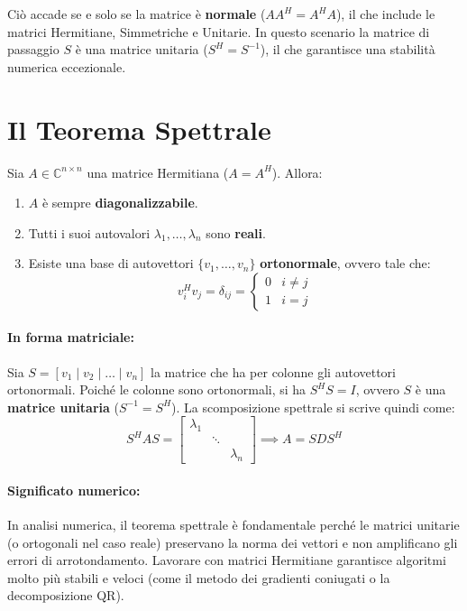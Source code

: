 \documentclass[a4paper,12pt]{article}
\begin{document}
	Ciò accade se e solo se la matrice è \textbf{normale} ($AA^H = A^HA$), il che include le matrici Hermitiane, Simmetriche e Unitarie. In questo scenario la matrice di passaggio $S$ è una matrice unitaria ($S^H = S^{-1}$), il che garantisce una stabilità numerica eccezionale.
	\section{Il Teorema Spettrale}
	
	\begin{tcolorbox}[title=Teorema Spettrale]
		Sia $A \in \mathbb{C}^{n \times n}$ una matrice Hermitiana ($A = A^H$). Allora:
		\begin{enumerate}
			\item $A$ è sempre \textbf{diagonalizzabile}.
			\item Tutti i suoi autovalori $\lambda_1, \dots, \lambda_n$ sono \textbf{reali}.
			\item Esiste una base di autovettori $\{v_1, \dots, v_n\}$ \textbf{ortonormale}, ovvero tale che:
			\begin{equation}
				v_i^H v_j = \delta_{ij} = \begin{cases} 0 & i \neq j \\ 1 & i = j \end{cases}
			\end{equation}
		\end{enumerate}
	\end{tcolorbox}
	
	\paragraph{In forma matriciale:}
	Sia $S = [v_1 \mid v_2 \mid \dots \mid v_n]$ la matrice che ha per colonne gli autovettori ortonormali. Poiché le colonne sono ortonormali, si ha $S^H S = I$, ovvero $S$ è una \textbf{matrice unitaria} ($S^{-1} = S^H$). 
	La scomposizione spettrale si scrive quindi come:
	\begin{equation}
		S^H A S = \begin{bmatrix} \lambda_1 & & \\ & \ddots & \\ & & \lambda_n \end{bmatrix} \implies A = S D S^H
	\end{equation}
	
	\paragraph{Significato numerico:}
	In analisi numerica, il teorema spettrale è fondamentale perché le matrici unitarie (o ortogonali nel caso reale) preservano la norma dei vettori e non amplificano gli errori di arrotondamento. Lavorare con matrici Hermitiane garantisce algoritmi molto più stabili e veloci (come il metodo dei gradienti coniugati o la decomposizione QR).
\end{document}
